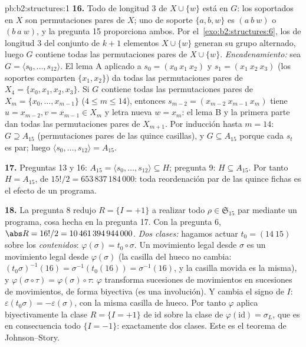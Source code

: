\begin{solution}{pb:b2:structures:1}
\textbf{16.} Todo  de longitud $3$ de $X \cup \{w\}$ está en
$G$: los soportados en $X$ son permutaciones pares de $X$; uno de
soporte $\{a, b, w\}$ es $(a\ b\ w)$ o $(b\ a\ w)$, y la pregunta
15 proporciona ambos. Por el~\cref{exo:b2:structures:6}, los 
de longitud $3$ del conjunto de $k+1$ elementos $X \cup \{w\}$
generan su grupo alternado, luego $G$ contiene todas las
permutaciones pares de $X \cup \{w\}$. \emph{Encadenamiento:} sea
$G = \langle s_0, \dots, s_{12}\rangle$. El lema A aplicado a $s_0
= (x_0\ x_1\ x_2)$ y $s_1 = (x_1\ x_2\ x_3)$ (los soportes comparten
$\{x_1, x_2\}$) da todas las permutaciones pares de $X_4 = \{x_0,
x_1, x_2, x_3\}$. Si $G$ contiene todas las permutaciones pares de
$X_m = \{x_0, \dots, x_{m-1}\}$ ($4 \leq m \leq 14$), entonces
$s_{m-2} = (x_{m-2}\ x_{m-1}\ x_m)$ tiene $u = x_{m-2}, v = x_{m-1}
\in X_m$ y letra nueva $w = x_m$: el lema B y la primera parte dan
todas las permutaciones pares de $X_{m+1}$. Por inducción hasta $m
= 14$: $G \supseteq A_{15}$ (permutaciones pares de las quince
casillas), y $G \subseteq A_{15}$ porque cada $s_t$ es par; luego
$\langle s_0, \dots, s_{12}\rangle = A_{15}$.

\textbf{17.} Preguntas 13 y 16: $A_{15} = \langle s_0, \dots,
s_{12}\rangle \subseteq H$; pregunta 9: $H \subseteq A_{15}$. Por
tanto $H = A_{15}$, de  $15!/2 = 653\,837\,184\,000$: toda
reordenación par de las quince fichas es el efecto de un programa.

\textbf{18.} La pregunta 8 redujo $R = \{I = +1\}$ a realizar todo
$\rho \in \mathfrak{S}_{15}$ par mediante un programa, cosa hecha
en la pregunta 17. Con la pregunta 6, $\abs R = 16!/2 =
10\,461\,394\,944\,000$. \emph{Dos clases:} hagamos actuar $t_0 =
(14\ 15)$ sobre los \emph{contenidos}: $\varphi(\sigma) = t_0 \circ
\sigma$. Un movimiento legal desde $\sigma$ es un movimiento legal
desde $\varphi(\sigma)$ (la casilla del hueco no cambia:
$(t_0\sigma)^{-1}(16) = \sigma^{-1}(t_0(16)) = \sigma^{-1}(16)$, y
la casilla movida es la misma), y $\varphi(\sigma \circ \tau) =
\varphi(\sigma) \circ \tau$: $\varphi$ transforma sucesiones de
movimientos en sucesiones de movimientos, de forma biyectiva (es
una involución). Y cambia el signo de $I$: $\varepsilon(t_0\sigma)
= -\varepsilon(\sigma)$, con la misma casilla de hueco. Por tanto
$\varphi$ aplica biyectivamente la clase $R = \{I = +1\}$ de
$\mathrm{id}$ sobre la clase de $\varphi(\mathrm{id}) = \sigma_L$,
que es en consecuencia todo $\{I = -1\}$: exactamente dos clases.
Este es el teorema de Johnson--Story.


\end{solution}

